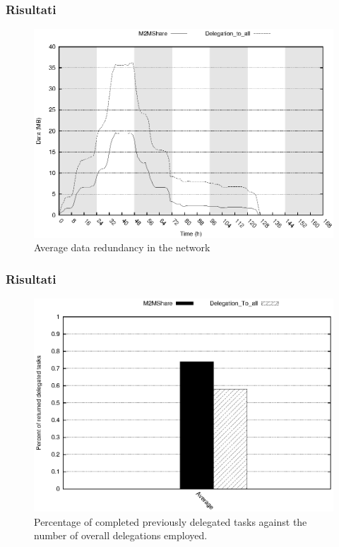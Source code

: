 \documentclass{beamer}
\begin{document}
\begin{frame}
\frametitle{Risultati}
\begin{center}
\begin{figure}[ht]
\includegraphics[scale=0.7]{../grafici/ridondanza.eps}
\caption{Average data redundancy in the network}
\end{figure}
\end{center}
\end{frame}

\begin{frame}
\frametitle{Risultati}
\begin{center}
\begin{figure}[ht]
\includegraphics[scale=0.7]{../grafici/percDeleghe.eps}
\caption{Percentage of completed previously delegated tasks against the number of overall delegations employed.}
\end{figure}
\end{center}
\end{frame}
\end{document}
